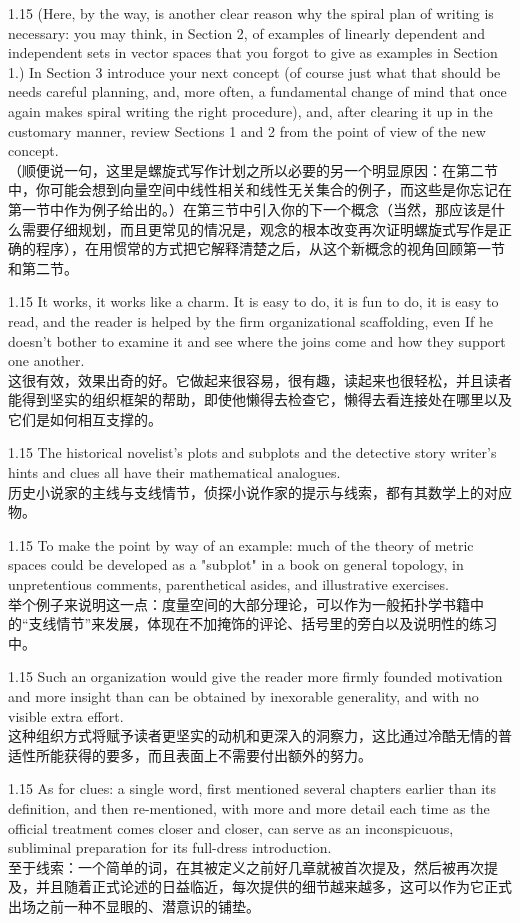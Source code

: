 \documentclass[12pt,a4paper]{article}
\newcommand{\bilingual}[2]{
    \begin{spacing}{1.15} %
        \noindent \normalsize #1 \\[-0.5ex] %
        \small \textcolor{blue!70!black}{#2} %
    \end{spacing}
    \vspace{0.8em} %
}
\begin{document}
\bilingual{(Here, by the way, is another clear reason why the spiral plan of writing is necessary: you may think, in Section 2, of examples of linearly dependent and independent sets in vector spaces that you forgot to give as examples in Section 1.) In Section 3 introduce your next concept (of course just what that should be needs careful planning, and, more often, a fundamental change of mind that once again makes spiral writing the right procedure), and, after clearing it up in the customary manner, review Sections 1 and 2 from the point of view of the new concept.}
{（顺便说一句，这里是螺旋式写作计划之所以必要的另一个明显原因：在第二节中，你可能会想到向量空间中线性相关和线性无关集合的例子，而这些是你忘记在第一节中作为例子给出的。）在第三节中引入你的下一个概念（当然，那应该是什么需要仔细规划，而且更常见的情况是，观念的根本改变再次证明螺旋式写作是正确的程序），在用惯常的方式把它解释清楚之后，从这个新概念的视角回顾第一节和第二节。} %

\bilingual{It works, it works like a charm. It is easy to do, it is fun to do, it is easy to read, and the reader is helped by the firm organizational scaffolding, even If he doesn't bother to examine it and see where the joins come and how they support one another.}
{这很有效，效果出奇的好。它做起来很容易，很有趣，读起来也很轻松，并且读者能得到坚实的组织框架的帮助，即使他懒得去检查它，懒得去看连接处在哪里以及它们是如何相互支撑的。} %

\bilingual{The historical novelist's plots and subplots and the detective story writer's hints and clues all have their mathematical analogues.}
{历史小说家的主线与支线情节，侦探小说作家的提示与线索，都有其数学上的对应物。} %

\bilingual{To make the point by way of an example: much of the theory of metric spaces could be developed as a "subplot" in a book on general topology, in unpretentious comments, parenthetical asides, and illustrative exercises.}
{举个例子来说明这一点：度量空间的大部分理论，可以作为一般拓扑学书籍中的“支线情节”来发展，体现在不加掩饰的评论、括号里的旁白以及说明性的练习中。} %

\bilingual{Such an organization would give the reader more firmly founded motivation and more insight than can be obtained by inexorable generality, and with no visible extra effort.}
{这种组织方式将赋予读者更坚实的动机和更深入的洞察力，这比通过冷酷无情的普适性所能获得的要多，而且表面上不需要付出额外的努力。} %

\bilingual{As for clues: a single word, first mentioned several chapters earlier than its definition, and then re-mentioned, with more and more detail each time as the official treatment comes closer and closer, can serve as an inconspicuous, subliminal preparation for its full-dress introduction.}
{至于线索：一个简单的词，在其被定义之前好几章就被首次提及，然后被再次提及，并且随着正式论述的日益临近，每次提供的细节越来越多，这可以作为它正式出场之前一种不显眼的、潜意识的铺垫。} %
\end{document}
